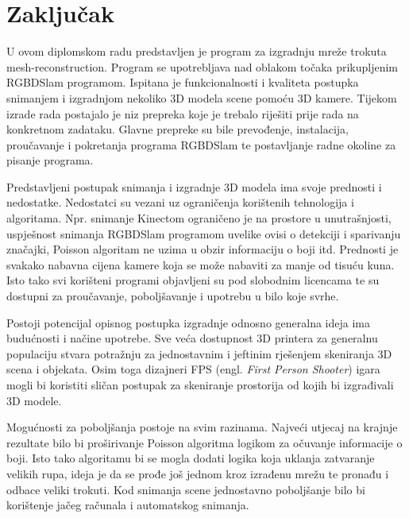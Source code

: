 \newpage
\setcounter{figure}{0}

\section{Zaključak} %
\label{sec:Zaključak}

U ovom diplomskom radu predstavljen je program za izgradnju mreže
trokuta mesh-reconstruction. Program se upotrebljava nad oblakom točaka
prikupljenim RGBDSlam programom. Ispitana je funkcionalnosti i
kvaliteta postupka snimanjem i izgradnjom nekoliko 3D modela scene
pomoću 3D kamere. Tijekom izrade rada postajalo je niz prepreka koje je
trebalo riješiti prije rada na konkretnom zadataku. Glavne prepreke su
bile prevođenje, instalacija, proučavanje i pokretanja programa RGBDSlam
te postavljanje radne okoline za pisanje programa. 

Predstavljeni postupak snimanja i izgradnje 3D modela ima svoje
prednosti i nedostatke. Nedostatci su vezani uz ograničenja korištenih
tehnologija i algoritama. Npr. snimanje Kinectom ograničeno je na
prostore u unutrašnjosti, uspješnost snimanja RGBDSlam programom uvelike
ovisi o detekciji i sparivanju značajki, Poisson algoritam ne uzima u
obzir informaciju o boji itd. Prednosti je svakako nabavna cijena
kamere koja se može nabaviti za manje od tisuću kuna. Isto tako svi
korišteni programi objavljeni su pod slobodnim licencama te su dostupni
za proučavanje, poboljšavanje i upotrebu u bilo koje svrhe.  

Postoji potencijal opisnog postupka izgradnje odnosno generalna ideja
ima budućnosti i načine upotrebe. Sve veća dostupnost 3D printera za
generalnu populaciju stvara potražnju za jednostavnim i jeftinim
rješenjem skeniranja 3D scena i objekata. Osim toga dizajneri FPS (engl.
\textit{First Person Shooter}) igara mogli bi koristiti sličan postupak
za skeniranje prostorija od kojih bi izgrađivali 3D modele.

Mogućnosti za poboljšanja postoje na svim razinama. Najveći utjecaj na
krajnje rezultate bilo bi proširivanje Poisson algoritma logikom za
očuvanje informacije o boji. Isto tako algoritamu bi se mogla dodati
logika koja uklanja zatvaranje velikih rupa, ideja je da se prođe još
jednom kroz izrađenu mrežu te pronađu i odbace veliki trokuti. Kod
snimanja scene jednostavno poboljšanje bilo bi korištenje jačeg računala
i automatskog snimanja.

